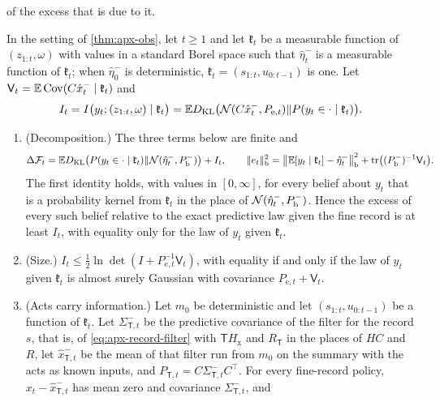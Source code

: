 of the excess that is due to it.

\begin{proposition}\label{prop:apx-obs-information}
In the setting of \cref{thm:apx-obs}, let $t\ge1$ and let $\mathfrak k_t$ be a measurable function of $(z_{1:t},\omega)$ with values in a standard Borel space such that $\hat\eta^-_t$ is a measurable function of $\mathfrak k_t$; when $\hat\eta^-_0$ is deterministic, $\mathfrak k_t=(s_{1:t},u_{0:t-1})$ is one. Let $\mathsf V_t=\mathbb{E}\operatorname{Cov}(C\hat x^-_t\mid\mathfrak k_t)$ and
\begin{equation*}
I_t=I\bigl(y_t;(z_{1:t},\omega)\mid\mathfrak k_t\bigr)=\mathbb{E}D_{\mathrm{KL}}\bigl(\mathcal{N}(C\hat x^-_t,P_{\mathrm e,t})\Vert P(y_t\in\cdot\mid\mathfrak k_t)\bigr).
\end{equation*}
\begin{enumerate}
\item[(a)] (Decomposition.) The three terms below are finite and
\begin{equation}\label{eq:apx-obs-decomposition}
\Delta\mathcal F_t=\mathbb{E}D_{\mathrm{KL}}\bigl(P(y_t\in\cdot\mid\mathfrak k_t)\Vert\mathcal{N}(\hat\eta^-_t,P^-_{\mathrm b})\bigr)+I_t,\qquad\Vert e_t\Vert_{\mathrm b}^2=\bigl\Vert\mathbb{E}[y_t\mid\mathfrak k_t]-\hat\eta^-_t\bigr\Vert_{\mathrm b}^2+\operatorname{tr}\bigl((P^-_{\mathrm b})^{-1}\mathsf V_t\bigr).
\end{equation}
The first identity holds, with values in $[0,\infty]$, for every belief about $y_t$ that is a probability kernel from $\mathfrak k_t$ in the place of $\mathcal{N}(\hat\eta^-_t,P^-_{\mathrm b})$. Hence the excess of every such belief relative to the exact predictive law given the fine record is at least $I_t$, with equality only for the law of $y_t$ given $\mathfrak k_t$.
\item[(b)] (Size.) $I_t\le\frac12\ln\det(I+P_{\mathrm e,t}^{-1}\mathsf V_t)$, with equality if and only if the law of $y_t$ given $\mathfrak k_t$ is almost surely Gaussian with covariance $P_{\mathrm e,t}+\mathsf V_t$.
\item[(c)] (Acts carry information.) Let $m_0$ be deterministic and let $(s_{1:t},u_{0:t-1})$ be a function of $\mathfrak k_t$. Let $\Sigma^-_{\mathsf T,t}$ be the predictive covariance of the filter for the record $s$, that is, of \eqref{eq:apx-record-filter} with $\mathsf TH_{\mathrm x}$ and $R_{\mathsf T}$ in the places of $HC$ and $R$, let $\hat x^-_{\mathsf T,t}$ be the mean of that filter run from $m_0$ on the summary with the acts as known inputs, and $P_{\mathsf T,t}=C\Sigma^-_{\mathsf T,t}C^\top$. For every fine-record policy, $x_t-\hat x^-_{\mathsf T,t}$ has mean zero and covariance $\Sigma^-_{\mathsf T,t}$, and

\end{enumerate}
\end{proposition}
